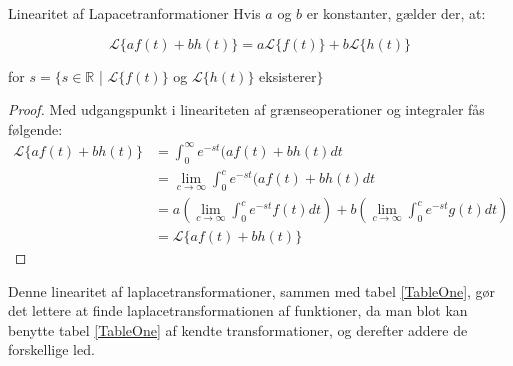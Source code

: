 \begin{mytheo}{Linearitet af Lapacetranformationer}{}
Hvis $a$ og $b$ er konstanter, gælder der, at:

$$\mathcal{L}\{af(t) + bh(t)\} = a\mathcal{L}\{f(t)\} + b\mathcal{L}\{h(t)\}$$

for $s = \{ s \in \mathbb{R}$ | $\mathcal{L}\{f(t)\}$ og $\mathcal{L}\{h(t)\}$ eksisterer$\}$
\end{mytheo}

\begin{proof}
Med udgangspunkt i lineariteten af grænseoperationer og integraler fås følgende:
\begin{align*}
    \mathcal{L}\{af(t) + bh(t)\} &= \int_0^\infty{e^{-st}(af(t) + bh(t)} dt\\
    &= \lim_{c\to\infty} \int_0^c{e^{-st}(af(t) + bh(t)} dt\\
    &= a \left( \lim_{c\to\infty} \int_0^c{e^{-st}f(t)} dt \right) + b \left(\lim_{c\to\infty} \int_0^c{e^{-st}g(t)} dt \right)\\
    &= \mathcal{L}\{af(t) + bh(t)\}
\end{align*}

\end{proof}

Denne linearitet af laplacetransformationer, sammen med tabel \ref{TableOne}, gør det lettere at finde laplacetransformationen af funktioner, da man blot kan benytte tabel \ref{TableOne} af kendte transformationer, og derefter addere de forskellige led.

